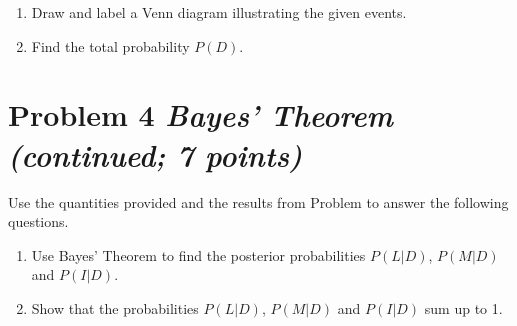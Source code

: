 \documentclass[11pt,twoside]{article}
\newcommand{\pts}[1]{\marginpar{ \small\hspace{0pt} \textit{[#1]} } }
\numberwithin{equation}{section}
\newcommand{\?}{\stackrel{?}{=}}
\begin{document}
\begin{enumerate}[\bf (a)]
\item Draw and label a Venn diagram illustrating the given events. \pts{5}
 \vspace{40ex}

\item Find the total probability $P(D)$. \pts{3}
  \vspace{20ex}
\end{enumerate}

\eject
\section*{Problem 4 \textit{Bayes' Theorem (continued; 7 points)}}
Use the quantities provided and the results from Problem to answer the following questions.
\begin{enumerate}[\bf (a)]
\item Use Bayes' Theorem to find the posterior probabilities $P(L|D)$, $P(M|D)$ and $P(I|D)$.\pts{6}
  \vspace{50ex}

\item Show that the probabilities $P(L|D)$, $P(M|D)$ and $P(I|D)$ sum up to 1. \pts{1}
  \vspace{15ex}


\end{enumerate}




    
    
\end{document}
